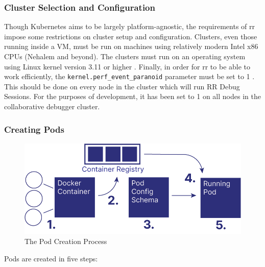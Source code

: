 \documentclass[12pt]{article}
\begin{document}
\subsubsection{Cluster Selection and Configuration}

Though Kubernetes aims to be largely platform-agnostic, the
requirements of rr impose some restrictions on cluster setup and
configuration.  Clusters, even those running inside a VM, must be run
on machines using relatively modern Intel x86 CPUs (Nehalem and
beyond).  The clusters must run on an operating system using Linux
kernel version 3.11 or higher \cite{rr-repo}.  Finally, in order for
rr to be able to work efficiently, the
\lstinline{kernel.perf_event_paranoid} parameter must be set to 1
\cite{rr-repo}.  This should be done on every node in the cluster
which will run RR Debug Sessions.  For the purposes of development, it
has been set to 1 on all nodes in the collaborative debugger cluster.

\subsubsection{Creating Pods}

\begin{figure}[h!]

  \includegraphics[scale=.9]{pod_creation}
  \centering
  \caption{The Pod Creation Process}
  \label{podcreation:overview}
\end{figure}

Pods are created in five steps:
\end{document}

